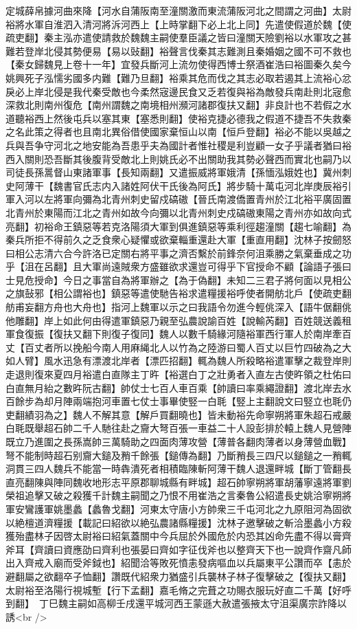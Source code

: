 定城薛帛據河曲來降【河水自蒲阪南至潼關激而東流蒲阪河北之間謂之河曲】太尉裕將水軍自淮泗入清河將泝河西上【上時掌翻下必上北上同】先遣使假道於魏【使疏吏翻】秦主泓亦遣使請救於魏魏主嗣使羣臣議之皆曰潼關天險劉裕以水軍攻之甚難若登岸北侵其勢便易【易以䜴翻】裕聲言伐秦其志難測且秦婚姻之國不可不救也【秦女歸魏見上卷十一年】宜發兵斷河上流勿使得西博士祭酒崔浩曰裕圖秦久矣今姚興死子泓懦劣國多内難【難乃旦翻】裕乘其危而伐之其志必取若遏其上流裕心忿戾必上岸北侵是我代秦受敵也今柔然宼邊民食又乏若復與裕為敵發兵南赴則北宼愈深救北則南州復危【南州謂魏之南境相州瀕河諸郡復扶又翻】非良計也不若假之水道聽裕西上然後屯兵以塞其東【塞悉則翻】使裕克捷必德我之假道不捷吾不失救秦之名此策之得者也且南北異俗借使國家棄恒山以南【恒戶登翻】裕必不能以吳越之兵與吾争守河北之地安能為吾患乎夫為國計者惟社稷是利豈顧一女子乎議者猶曰裕西入關則恐吾斷其後腹背受敵北上則姚氏必不出關助我其勢必聲西而實北也嗣乃以司徒長孫暠督山東諸軍事【長知兩翻】又遣振威將軍娥清【孫愐泓娥姓也】冀州刺史阿薄干【魏書官氏志内入諸姓阿伏干氏後為阿氏】將步騎十萬屯河北岸庚辰裕引軍入河以左將軍向彌為北青州刺史留戍碻磝【晉氏南渡僑置青州於江北裕平廣固置北青州於東陽而江北之青州如故今向彌以北青州刺史戍碻磝東陽之青州亦如故向式亮翻】初裕命王鎮惡等若克洛陽須大軍到俱進鎮惡等乘利徑趨潼關【趨七喻翻】為秦兵所拒不得前久之乏食衆心疑懼或欲棄輜重還赴大軍【重直用翻】沈林子按劒怒曰相公志清六合今許洛已定關右將平事之濟否繫於前鋒奈何沮乘勝之氣棄垂成之功乎【沮在呂翻】且大軍尚遠賊衆方盛雖欲求還豈可得乎下官授命不顧【論語子張曰士見危授命】今日之事當自為將軍辦之【為于偽翻】未知二三君子將何面以見相公之旗鼔邪【相公謂裕也】鎮惡等遣使馳告裕求遣糧援裕呼使者開舫北戶【使疏吏翻舫甫妄翻方舟也大舟也】指河上魏軍以示之曰我語令勿進今輕佻深入【語牛倨翻佻他雕翻】岸上如此何由得遣軍鎮惡乃親至弘農說諭百姓【說輸芮翻】百姓競送義租軍食復振【復扶又翻下則復子復同】魏人以數千騎緣河隨裕軍西行軍人於南岸牽百丈【百丈者所以挽船今南人用麻䋲北人以竹為之陸游曰蜀人百丈以巨竹四破為之大如人臂】風水迅急有漂渡北岸者【漂匹招翻】輒為魏人所殺略裕遣軍擊之裁登岸則走退則復來夏四月裕遣白直隊主丁旿【裕選白丁之壯勇者入直左古使旿領之杜佑曰白直無月紿之數旿阮古翻】帥仗士七百人車百乘【帥讀曰率乘繩證翻】渡北岸去水百餘步為却月陣兩端抱河車置七仗士事畢使竪一白毦【竪上主翻說文曰竪立也毦仍吏翻績羽為之】魏人不解其意【解戶買翻曉也】皆未動裕先命寧朔將軍朱超石戒嚴白毦既舉超石帥二千人馳往赴之齎大弩百張一車益二十人設彭排於轅上魏人見營陣既立乃進圍之長孫嵩帥三萬騎助之四面肉薄攻營【薄普各翻肉薄者以身薄營血戰】弩不能制時超石别齎大鎚及矟千餘張【鎚傳為翻】乃斷矟長三四尺以鎚鎚之一矟輒洞貫三四人魏兵不能當一時犇潰死者相積臨陳斬阿薄干魏人退還畔城【斷丁管翻長直亮翻陳與陣同魏收地形志平原郡聊城縣有畔城】超石帥寧朔將軍胡藩寧遠將軍劉榮祖追擊又破之殺獲千計魏主嗣聞之乃恨不用崔浩之言秦魯公紹遣長史姚洽寧朔將軍安鸞護軍姚墨蠡【蠡魯戈翻】河東太守唐小方帥衆三千屯河北之九原阻河為固欲以絶檀道濟糧援【載記曰紹欲以絶弘農諸縣糧援】沈林子邀擊破之斬洽墨蠡小方殺獲殆盡林子因啓太尉裕曰紹氣蓋關中今兵屈於外國危於内恐其凶命先盡不得以膏齊斧耳【齊讀曰資應劭曰齊利也張晏曰齊如字征伐斧也以整齊天下也一說齊作齋凡師出入齊戒入廟而受斧鉞也】紹聞洽等敗死憤恚發病嘔血以兵屬東平公讚而卒【恚於避翻屬之欲翻卒子恤翻】讚既代紹衆力猶盛引兵襲林子林子復擊破之【復扶又翻】太尉裕至洛陽行視城塹【行下孟翻】嘉毛脩之完葺之功賜衣服玩好直二千萬【好呼到翻】　丁巳魏主嗣如高柳壬戌還平城河西王蒙遜大赦遣張掖太守沮渠廣宗詐降以誘<br />
